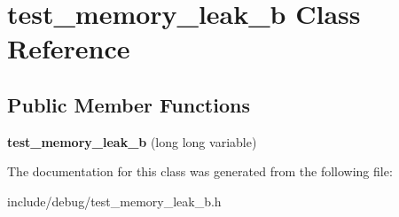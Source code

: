 \hypertarget{classtest__memory__leak__b}{\section{test\-\_\-memory\-\_\-leak\-\_\-b Class Reference}
\label{classtest__memory__leak__b}
}
\subsection*{Public Member Functions}
\begin{DoxyCompactItemize}
\item 
\hypertarget{classtest__memory__leak__b_aac008e39fec4f6e274139db495fe5896}{{\bfseries test\-\_\-memory\-\_\-leak\-\_\-b} (long long variable)}\label{classtest__memory__leak__b_aac008e39fec4f6e274139db495fe5896}

\end{DoxyCompactItemize}


The documentation for this class was generated from the following file\-:\begin{DoxyCompactItemize}
\item 
include/debug/test\-\_\-memory\-\_\-leak\-\_\-b.\-h\end{DoxyCompactItemize}
